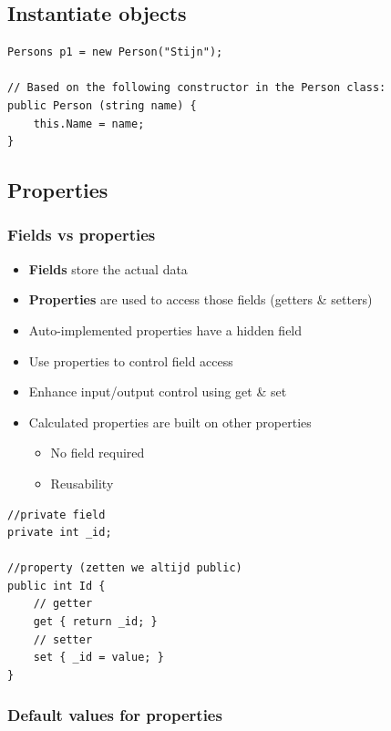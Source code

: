 \documentclass{article}
\newcommand{\bold}[1]{\textbf{#1}}
\begin{document}
\subsection{Instantiate objects}

\begin{verbatim}
Persons p1 = new Person("Stijn");

// Based on the following constructor in the Person class:
public Person (string name) {
    this.Name = name;
}
\end{verbatim}

\subsection{Properties}

\subsubsection{Fields vs properties}

\begin{itemize}
    \item \bold{Fields} store the actual data
    \item \bold{Properties} are used to access those fields (getters \& setters)
    \item Auto-implemented properties have a hidden field
    \item Use properties to control field access
    \item Enhance input/output control using get \& set
    \item Calculated properties are built on other properties
    \begin{itemize}
        \item No field required
        \item Reusability
    \end{itemize}
\end{itemize}

\begin{verbatim}
//private field
private int _id;

//property (zetten we altijd public)
public int Id {
    // getter
    get { return _id; }
    // setter
    set { _id = value; }
}
\end{verbatim}


\subsubsection{Default values for properties}
\end{document}
